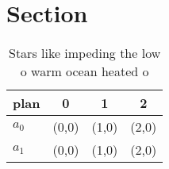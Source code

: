 \documentclass[a4paper]{article}
\begin{document}
\section{Section}

\begin{table}
\begin{adjustbox}{width=0.6\columnwidth}
\begin{tabular}{|l|l|l|l|}
\hline
\textbf{plan} & \multicolumn{1}{c|}{\textbf{0}} & \multicolumn{1}{c|}{\textbf{1}} & \multicolumn{1}{c|}{\textbf{2}} \\ \hline
\textbf{$a_0$}  & (0,0) & (1,0) & (2,0) \\ \hline
\textbf{$a_1$}  & (0,0) & (1,0) & (2,0) \\ \hline
\end{tabular}
\end{adjustbox}
\caption{Stars like impeding the low o warm ocean heated o
}
\end{table}
\end{document}
